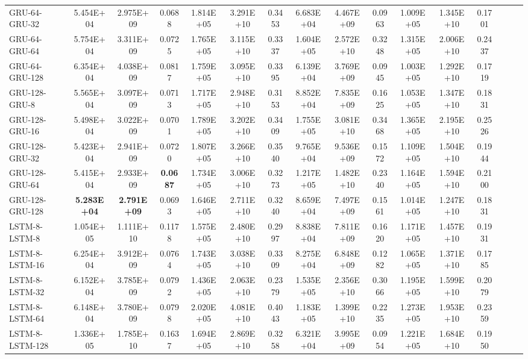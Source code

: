 \begin{landscape}
\begin{longtable}{|l|c|c|c|c|c|c|c|c|c|c|c|c|c|c|c|}
    GRU-64-GRU-32 & 5.454E+04 & 2.975E+09 & 0.0688 & 1.814E+05 & 3.291E+10 & 0.3453 & 6.683E+04 & 4.467E+09 & 0.0963 & 1.009E+05 & 1.345E+10 & 0.1701 \\
    GRU-64-GRU-64 & 5.754E+04 & 3.311E+09 & 0.0725 & 1.765E+05 & 3.115E+10 & 0.3337 & 1.604E+05 & 2.572E+10 & 0.3248 & 1.315E+05 & 2.006E+10 & 0.2437 \\
    GRU-64-GRU-128 & 6.354E+04 & 4.038E+09 & 0.0817 & 1.759E+05 & 3.095E+10 & 0.3395 & 6.139E+04 & 3.769E+09 & 0.0945 & 1.003E+05 & 1.292E+10 & 0.1719 \\
    GRU-128-GRU-8 & 5.565E+04 & 3.097E+09 & 0.0713 & 1.717E+05 & 2.948E+10 & 0.3153 & 8.852E+04 & 7.835E+09 & 0.1625 & 1.053E+05 & 1.347E+10 & 0.1831 \\
    GRU-128-GRU-16 & 5.498E+04 & 3.022E+09 & 0.0701 & 1.789E+05 & 3.202E+10 & 0.3409 & 1.755E+05 & 3.081E+10 & 0.3468 & 1.365E+05 & 2.195E+10 & 0.2526 \\
    GRU-128-GRU-32 & 5.423E+04 & 2.941E+09 & 0.0720 & 1.807E+05 & 3.266E+10 & 0.3540 & 9.765E+04 & 9.536E+09 & 0.1572 & 1.109E+05 & 1.504E+10 & 0.1944 \\
    GRU-128-GRU-64 & 5.415E+04 & 2.933E+09 & \cellcolor[rgb]{ .573,  .816,  .314}\textbf{0.0687} & 1.734E+05 & 3.006E+10 & 0.3273 & 1.217E+05 & 1.482E+10 & 0.2340 & 1.164E+05 & 1.594E+10 & 0.2100 \\
    GRU-128-GRU-128 & \cellcolor[rgb]{ .573,  .816,  .314}\textbf{5.283E+04} & \cellcolor[rgb]{ .573,  .816,  .314}\textbf{2.791E+09} & 0.0693 & 1.646E+05 & 2.711E+10 & 0.3240 & 8.659E+04 & 7.497E+09 & 0.1561 & 1.014E+05 & 1.247E+10 & 0.1831 \\
    \midrule
    LSTM-8-LSTM-8 & 1.054E+05 & 1.111E+10 & 0.1178 & 1.575E+05 & 2.480E+10 & 0.2997 & 8.838E+04 & 7.811E+09 & 0.1620 & 1.171E+05 & 1.457E+10 & 0.1931 \\
    LSTM-8-LSTM-16 & 6.254E+04 & 3.912E+09 & 0.0764 & 1.743E+05 & 3.038E+10 & 0.3309 & 8.275E+04 & 6.848E+09 & 0.1282 & 1.065E+05 & 1.371E+10 & 0.1785 \\
    LSTM-8-LSTM-32 & 6.152E+04 & 3.785E+09 & 0.0792 & 1.436E+05 & 2.063E+10 & 0.2379 & 1.535E+05 & 2.356E+10 & 0.3066 & 1.195E+05 & 1.599E+10 & 0.2079 \\
    LSTM-8-LSTM-64 & 6.148E+04 & 3.780E+09 & 0.0798 & 2.020E+05 & 4.081E+10 & 0.4043 & 1.183E+05 & 1.399E+10 & 0.2235 & 1.273E+05 & 1.953E+10 & 0.2359 \\
    LSTM-8-LSTM-128 & 1.336E+05 & 1.785E+10 & 0.1637 & 1.694E+05 & 2.869E+10 & 0.3258 & 6.321E+04 & 3.995E+09 & 0.0954 & 1.221E+05 & 1.684E+10 & 0.1950 \\

\end{longtable}
\end{landscape}
